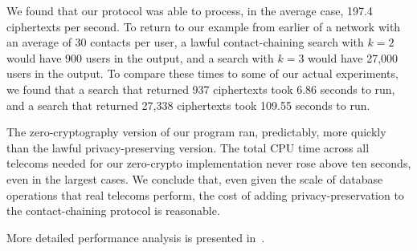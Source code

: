We found that our protocol was able to process, in the average case, 197.4 ciphertexts per second. To return to our example from earlier of a network with an average of 30 contacts per user, a lawful contact-chaining search with $k=2$ would have 900 users in the output, and a search with $k=3$ would have 27,000 users in the output. To compare these times to some of our actual experiments, we found that a search that returned 937 ciphertexts took 6.86 seconds to run, and a search that returned 27,338 ciphertexts took 109.55 seconds to run. 

The zero-cryptography version of our program ran, predictably, more quickly than the lawful privacy-preserving version. The total CPU time across all telecoms needed for our zero-crypto implementation never rose above ten seconds, even in the largest cases. 
We conclude that, even given the scale of database operations that real 
telecoms perform, the cost of adding privacy-preservation to the contact-chaining protocol is reasonable.

More detailed performance analysis is presented in~\cite[Section 4.3]{sff-TR}.
